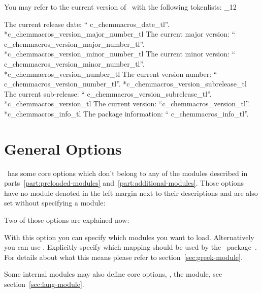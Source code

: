 \documentclass[load-preamble+]{cnltx-doc}
\makeatletter
\def\chemmodule*#1{\textquotedblleft#1\textquotedblright}%
\renewenvironment{commands}
  {%
    \cnltx@set@catcode_{12}%
    \let\command\cnltx@command
    \cnltxlist
  }
  {\endcnltxlist}
\makeatother
\begin{document}
You may refer to the current version of \chemmacros\ with the following
tokenlists:
\begin{commands}
  \command*{c_chemmacros_date_tl}
    The current release date: \enquote{\csname
      c_chemmacros_date_tl\endcsname}.
  \command*{c_chemmacros_version_major_number_tl}
    The current major version: \enquote{\csname
    c_chemmacros_version_major_number_tl\endcsname}.
  \command*{c_chemmacros_version_minor_number_tl}
    The current minor version: \enquote{\csname
    c_chemmacros_version_minor_number_tl\endcsname}.
  \command*{c_chemmacros_version_number_tl}
    The current version number: \enquote{\csname
    c_chemmacros_version_number_tl\endcsname}.
  \command*{c_chemmacros_version_subrelease_tl}
    The current sub-release: \enquote{\csname
    c_chemmacros_version_subrelease_tl\endcsname}.
  \command*{c_chemmacros_version_tl}
    The current version: \enquote{\csname c_chemmacros_version_tl\endcsname}.
  \command*{c_chemmacros_info_tl}
    The package information: \enquote{\csname
      c_chemmacros_info_tl\endcsname}.
\end{commands}

\section{General Options}\label{sec:general-options}

\chemmacros\ has some core options which don't belong to any of the modules
described in parts~\ref{part:preloaded-modules}
and~\ref{part:additional-modules}.  Those options have no module denoted in
the left margin next to their descriptions and are also set without specifying
a module:
\begin{sourcecode}
\end{sourcecode}

Two of those options are explained now:
\begin{options}
  \Default
    With this option you can specify which modules you want to load.
    Alternatively you can use .
  \Default
    Explicitly specify which mapping should be used by the \chemgreek\
    package~\cite{pkg:chemgreek}.  For details about what this means please
    refer to section~\vref{sec:greek-module}.
\end{options}

Some internal modules may also define core options, \eg, the 
module, see section~\vref{sec:lang-module}.
\end{document}
